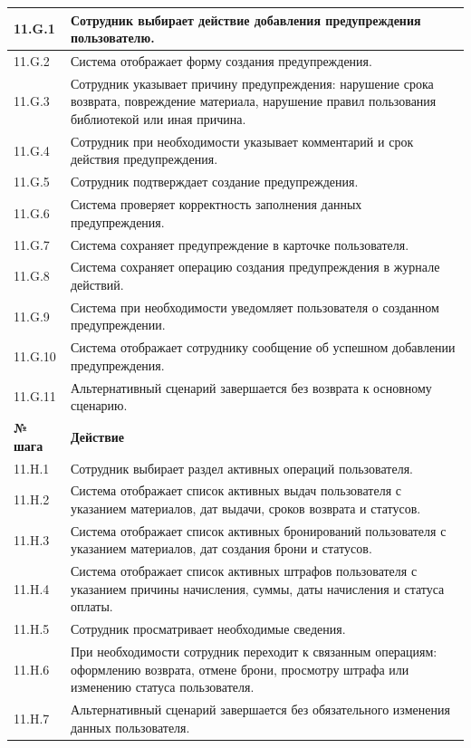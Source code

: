 \documentclass[12pt,a4paper]{article}
\begin{document}
\begin{xltabular}{\textwidth}{
			|>{\raggedright\arraybackslash}p{2.7cm}
			|>{\raggedright\arraybackslash}X|
		}
		11.G.1 & Сотрудник выбирает действие добавления предупреждения пользователю. \\
		\hline
		11.G.2 & Система отображает форму создания предупреждения. \\
		\hline
		11.G.3 & Сотрудник указывает причину предупреждения: нарушение срока
		возврата, повреждение материала, нарушение правил пользования
		библиотекой или иная причина. \\
		\hline
		11.G.4 & Сотрудник при необходимости указывает комментарий и срок действия
		предупреждения. \\
		\hline
		11.G.5 & Сотрудник подтверждает создание предупреждения. \\
		\hline
		11.G.6 & Система проверяет корректность заполнения данных предупреждения. \\
		\hline
		11.G.7 & Система сохраняет предупреждение в карточке пользователя. \\
		\hline
		11.G.8 & Система сохраняет операцию создания предупреждения в журнале
		действий. \\
		\hline
		11.G.9 & Система при необходимости уведомляет пользователя о созданном
		предупреждении. \\
		\hline
		11.G.10 & Система отображает сотруднику сообщение об успешном добавлении
		предупреждения. \\
		\hline
		11.G.11 & Альтернативный сценарий завершается без возврата к основному
		сценарию. \\
		\hline
		
		
		\textbf{№ шага} & \textbf{Действие} \\
		\hline
		
		11.H.1 & Сотрудник выбирает раздел активных операций пользователя. \\
		\hline
		11.H.2 & Система отображает список активных выдач пользователя с указанием
		материалов, дат выдачи, сроков возврата и статусов. \\
		\hline
		11.H.3 & Система отображает список активных бронирований пользователя с
		указанием материалов, дат создания брони и статусов. \\
		\hline
		11.H.4 & Система отображает список активных штрафов пользователя с
		указанием причины начисления, суммы, даты начисления и статуса
		оплаты. \\
		\hline
		11.H.5 & Сотрудник просматривает необходимые сведения. \\
		\hline
		11.H.6 & При необходимости сотрудник переходит к связанным операциям:
		оформлению возврата, отмене брони, просмотру штрафа или изменению
		статуса пользователя. \\
		\hline
		11.H.7 & Альтернативный сценарий завершается без обязательного изменения
		данных пользователя. \\
		\hline
		

\end{xltabular}
\end{document}
